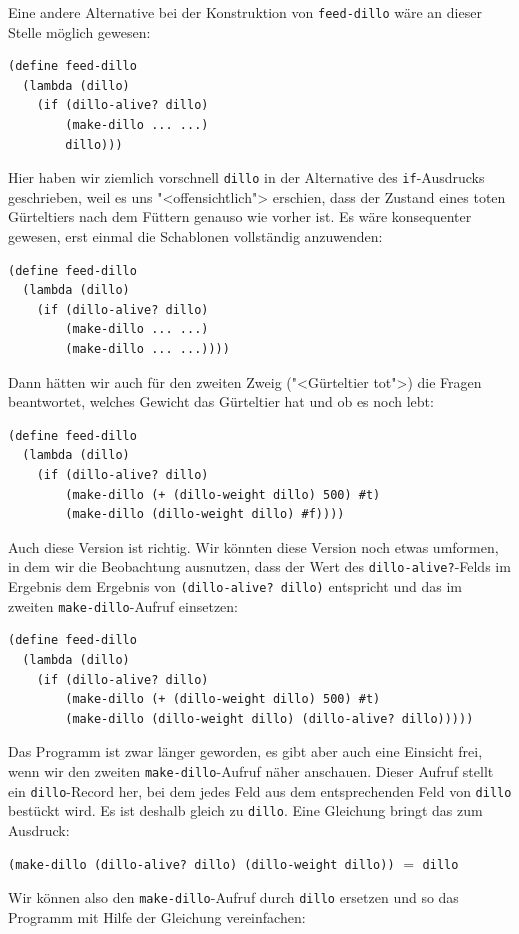 Eine andere Alternative bei der Konstruktion von \lstinline{feed-dillo}
wäre an dieser Stelle möglich gewesen:
%
\begin{lstlisting}
(define feed-dillo
  (lambda (dillo)
    (if (dillo-alive? dillo)
        (make-dillo ... ...)
        dillo)))
\end{lstlisting}
%
Hier haben wir ziemlich vorschnell \lstinline{dillo} in der Alternative des
\lstinline{if}-Ausdrucks geschrieben, weil es uns "<offensichtlich"> erschien, dass
der Zustand eines toten Gürteltiers nach dem Füttern genauso wie
vorher ist.  Es wäre konsequenter gewesen, erst einmal die Schablonen
vollständig anzuwenden:
%
\begin{lstlisting}
(define feed-dillo
  (lambda (dillo)
    (if (dillo-alive? dillo)
        (make-dillo ... ...)
        (make-dillo ... ...))))
\end{lstlisting}
%
Dann hätten wir auch für den zweiten Zweig ("<Gürteltier tot">) die Fragen beantwortet,
welches Gewicht das Gürteltier hat und ob es noch lebt:
%
\begin{lstlisting}
(define feed-dillo
  (lambda (dillo)
    (if (dillo-alive? dillo)
        (make-dillo (+ (dillo-weight dillo) 500) #t)
        (make-dillo (dillo-weight dillo) #f))))
\end{lstlisting}
%
Auch diese Version ist richtig.  Wir könnten diese Version noch etwas
umformen, in dem wir die Beobachtung ausnutzen, dass der Wert des
\lstinline{dillo-alive?}-Felds im Ergebnis dem Ergebnis von
\lstinline{(dillo-alive? dillo)} entspricht und das im zweiten
\lstinline{make-dillo}-Aufruf einsetzen:
%
\begin{lstlisting}
(define feed-dillo
  (lambda (dillo)
    (if (dillo-alive? dillo)
        (make-dillo (+ (dillo-weight dillo) 500) #t)
        (make-dillo (dillo-weight dillo) (dillo-alive? dillo)))))
\end{lstlisting}
%
Das Programm ist zwar länger geworden, es gibt aber auch eine Einsicht
frei, wenn wir den zweiten \lstinline{make-dillo}-Aufruf näher anschauen.
Dieser Aufruf stellt ein \lstinline{dillo}-Record her, bei dem jedes Feld
aus dem entsprechenden Feld von \lstinline{dillo} bestückt wird.  Es ist
deshalb gleich zu \lstinline{dillo}.  Eine Gleichung bringt das zum Ausdruck:
%
\begin{center}
  \lstinline{(make-dillo (dillo-alive? dillo) (dillo-weight dillo))} $=$ \lstinline{dillo}
\end{center}
%
Wir können also den \lstinline{make-dillo}-Aufruf durch \lstinline{dillo}
ersetzen und so das Programm mit Hilfe der Gleichung vereinfachen:
